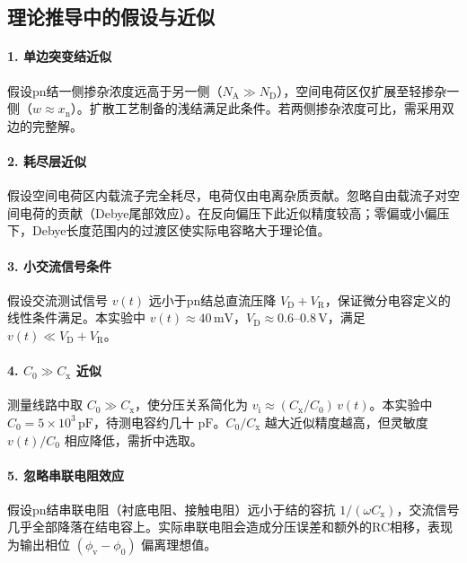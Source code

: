 
\subsection*{理论推导中的假设与近似}

\paragraph{1. 单边突变结近似}
假设pn结一侧掺杂浓度远高于另一侧（$N_{\mathrm{A}} \gg N_{\mathrm{D}}$），空间电荷区仅扩展至轻掺杂一侧（$w \approx x_{\mathrm{n}}$）。扩散工艺制备的浅结满足此条件。若两侧掺杂浓度可比，需采用双边的完整解。

\paragraph{2. 耗尽层近似}
假设空间电荷区内载流子完全耗尽，电荷仅由电离杂质贡献。忽略自由载流子对空间电荷的贡献（Debye尾部效应）。在反向偏压下此近似精度较高；零偏或小偏压下，Debye长度范围内的过渡区使实际电容略大于理论值。

\paragraph{3. 小交流信号条件}
假设交流测试信号 $v(t)$ 远小于pn结总直流压降 $V_{\mathrm{D}} + V_{\mathrm{R}}$，保证微分电容定义的线性条件满足。本实验中 $v(t) \approx 40\,\mathrm{mV}$，$V_{\mathrm{D}} \approx 0.6$--$0.8\,\mathrm{V}$，满足 $v(t) \ll V_{\mathrm{D}} + V_{\mathrm{R}}$。

\paragraph{4. $C_{0} \gg C_{\mathrm{x}}$ 近似}
测量线路中取 $C_{0} \gg C_{\mathrm{x}}$，使分压关系简化为 $v_{\mathrm{i}} \approx (C_{\mathrm{x}}/C_{0})\,v(t)$。本实验中 $C_{0} = 5\times 10^{3}\,\mathrm{pF}$，待测电容约几十 $\mathrm{pF}$。$C_{0}/C_{\mathrm{x}}$ 越大近似精度越高，但灵敏度 $v(t)/C_{0}$ 相应降低，需折中选取。

\paragraph{5. 忽略串联电阻效应}
假设pn结串联电阻（衬底电阻、接触电阻）远小于结的容抗 $1/(\omega C_{\mathrm{x}})$，交流信号几乎全部降落在结电容上。实际串联电阻会造成分压误差和额外的RC相移，表现为输出相位 $(\phi_{\mathrm{v}} - \phi_{0})$ 偏离理想值。

